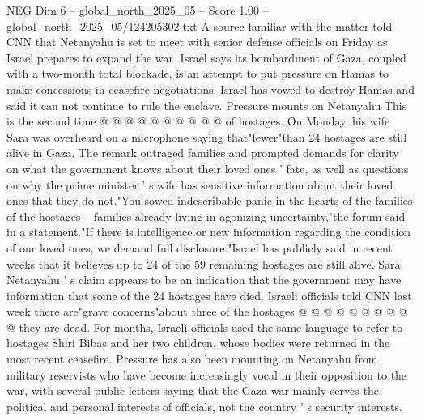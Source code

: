 \begin{textsample}{NEG Dim 6 – global\_north\_2025\_05 – Score 1.00 – global\_north\_2025\_05/124205302.txt}
A source familiar with the matter told CNN that Netanyahu is set to meet with senior defense officials on Friday as Israel prepares to expand the war.
Israel says its bombardment of Gaza, coupled with a two-month total blockade, is an attempt to put pressure on Hamas to make concessions in ceasefire negotiations.
Israel has vowed to destroy Hamas and said it can not continue to rule the enclave.
Pressure mounts on Netanyahu This is the second time @ @ @ @ @ @ @ @ @ @ of hostages.
On Monday, his wife Sara was overheard on a microphone saying that"fewer"than 24 hostages are still alive in Gaza.
The remark outraged families and prompted demands for clarity on what the government knows about their loved ones ' fate, as well as questions on why the prime minister ' s wife has sensitive information about their loved ones that they do not."You sowed indescribable panic in the hearts of the families of the hostages -- families already living in agonizing uncertainty,"the forum said in a statement."If there is intelligence or new information regarding the condition of our loved ones, we demand full disclosure."Israel has publicly said in recent weeks that it believes up to 24 of the 59 remaining hostages are still alive.
Sara Netanyahu ' s claim appears to be an indication that the government may have information that some of the 24 hostages have died.
Israeli officials told CNN last week there are"grave concerns"about three of the hostages @ @ @ @ @ @ @ @ @ @ they are dead.
For months, Israeli officials used the same language to refer to hostages Shiri Bibas and her two children, whose bodies were returned in the most recent ceasefire.
Pressure has also been mounting on Netanyahu from military reservists who have become increasingly vocal in their opposition to the war, with several public letters saying that the Gaza war mainly serves the political and personal interests of officials, not the country ' s security interests.

\end{textsample}
